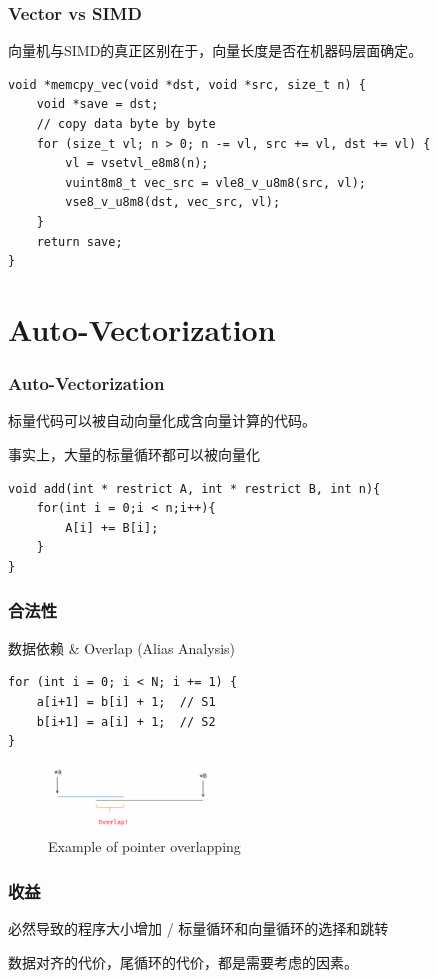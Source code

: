 \documentclass[aspectratio=169]{ctexbeamer}
\begin{document}
\begin{frame}[fragile]
    \frametitle{Vector vs SIMD}

    向量机与SIMD的真正区别在于，向量长度是否在机器码层面确定。

    \begin{lstlisting}
void *memcpy_vec(void *dst, void *src, size_t n) {
    void *save = dst;
    // copy data byte by byte
    for (size_t vl; n > 0; n -= vl, src += vl, dst += vl) {
        vl = vsetvl_e8m8(n);
        vuint8m8_t vec_src = vle8_v_u8m8(src, vl);
        vse8_v_u8m8(dst, vec_src, vl);
    }
    return save;
}
    \end{lstlisting}


\end{frame}

\section{Auto-Vectorization}

\begin{frame}[fragile]
    \frametitle{Auto-Vectorization}

    标量代码可以被自动向量化成含向量计算的代码。

    事实上，大量的标量循环都可以被向量化

    \begin{lstlisting}
void add(int * restrict A, int * restrict B, int n){
    for(int i = 0;i < n;i++){
        A[i] += B[i];
    }
}
    \end{lstlisting}


\end{frame}

\begin{frame}[fragile]
    \frametitle{合法性}

    数据依赖 \& Overlap (Alias Analysis)

    \begin{lstlisting}
for (int i = 0; i < N; i += 1) {
    a[i+1] = b[i] + 1;  // S1
    b[i+1] = a[i] + 1;  // S2
}
    \end{lstlisting}

    \begin{figure}
        \centering
        \includegraphics[width=0.4\textwidth]{images/overlap.png}
        \caption{Example of pointer overlapping}
    \end{figure}

\end{frame}

\begin{frame}
    \frametitle{收益}

    必然导致的程序大小增加 / 标量循环和向量循环的选择和跳转

    数据对齐的代价，尾循环的代价，都是需要考虑的因素。

\end{frame}
\end{document}
